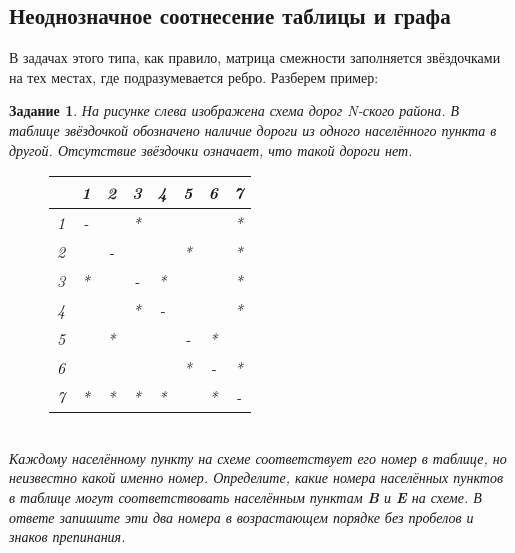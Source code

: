 \documentclass[12pt]{article}
\theoremstyle{problem_style}
\newtheorem{problem}{Задание}[subsection]
\begin{document}
\subsection{Неоднозначное соотнесение таблицы и графа}\label{ambig_match}
В задачах этого типа, как правило, матрица смежности заполняется звёздочками на тех местах, где подразумевается ребро. Разберем пример:
\begin{problem}
На рисунке слева изображена схема дорог N-ского района. В таблице звёздочкой обозначено наличие дороги из одного населённого пункта в другой. Отсутствие звёздочки означает, что такой дороги нет.
\begin{figure}[h]
    \centering
    \begin{minipage}[t!]{0.45\textwidth}
        \centering
        \begin{tabular}{|c|c|c|c|c|c|c|c|}\hline
        & 1 & 2 & 3 & 4 & 5 & 6 & 7 \\ \hline
        1 & - & & * & & &  & * \\ \hline
        2 & & - &  & & * &  & * \\ \hline
        3 & * & & - & * & & & * \\ \hline
        4 & & & * & - & & & * \\ \hline
        5 & & * & & & - & * & \\ \hline
        6 & & & & & * & - & * \\ \hline
        7 & * & * & * & * & & * & - \\ \hline
        \end{tabular}
    \end{minipage}
    \hfill
    \begin{minipage}[t!]{0.45\textwidth}
        \centering
    \end{minipage}
\end{figure}\\
Каждому населённому пункту на схеме соответствует его номер в таблице, но неизвестно какой именно номер. Определите, какие номера населённых пунктов в таблице могут соответствовать населённым пунктам \textbf{B} и \textbf{E} на схеме. В ответе запишите эти два номера в возрастающем порядке без пробелов и знаков препинания.\\

\end{problem}
\end{document}

